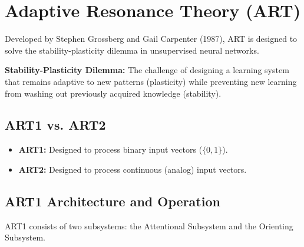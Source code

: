 \documentclass[12pt,a4paper]{article}
\begin{document}
\section{Adaptive Resonance Theory (ART)}

Developed by Stephen Grossberg and Gail Carpenter (1987), ART is designed to solve the stability-plasticity dilemma in unsupervised neural networks.

\begin{tcolorbox}[defbox, title={Stability-Plasticity Dilemma}]
\textbf{Stability-Plasticity Dilemma:} The challenge of designing a learning system that remains adaptive to new patterns (plasticity) while preventing new learning from washing out previously acquired knowledge (stability).
\end{tcolorbox}

\subsection{ART1 vs. ART2}
\begin{itemize}[leftmargin=*, itemsep=3pt]
  \item \textbf{ART1:} Designed to process binary input vectors ($\{0, 1\}$).
  \item \textbf{ART2:} Designed to process continuous (analog) input vectors.
\end{itemize}

\subsection{ART1 Architecture and Operation}
ART1 consists of two subsystems: the Attentional Subsystem and the Orienting Subsystem.
\end{document}
